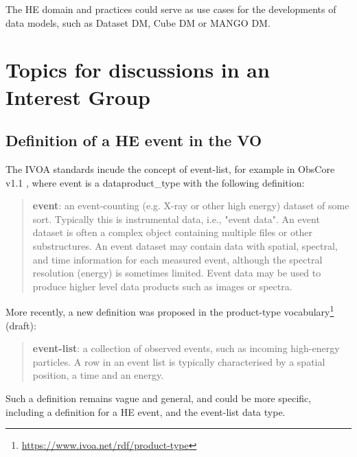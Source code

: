 \documentclass[11pt,a4paper]{ivoa}
\begin{document}
The HE domain and practices could serve as use cases for the developments of data models, such as Dataset DM, Cube DM or MANGO DM.


\section{Topics for discussions in an Interest Group}


\subsection{Definition of a HE event in the VO}

The IVOA standards incude the concept of event-list, for example in ObsCore v1.1 \citep{2017ivoa.spec.0509L}, where event is a dataproduct\_type with the following definition:
\begin{quote}
    \textbf{event}: an event-counting (e.g. X-ray or other high energy) dataset of some sort. Typically this is instrumental data, i.e., "event data". An event dataset is often a complex object containing multiple files or other substructures. An event dataset may contain data with spatial, spectral, and time information for each measured event, although the spectral resolution (energy) is sometimes limited. Event data may be used to produce higher level data products such as images or spectra.
\end{quote}

More recently, a new definition was proposed in the product-type vocabulary\footnote{\url{https://www.ivoa.net/rdf/product-type}} (draft):
\begin{quote}
    \textbf{event-list}: a collection of observed events, such as incoming high-energy particles. A row in an event list is typically characterised by a spatial position, a time and an energy.
\end{quote}

Such a definition remains vague and general, and could be more specific, including a definition for a HE event, and the event-list data type.
\end{document}
